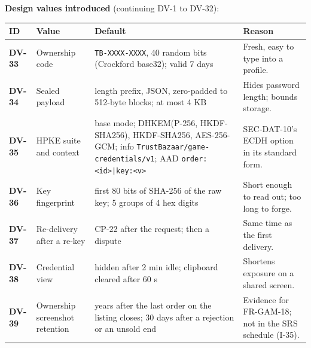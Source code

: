 \documentclass[11pt,a4paper]{article}
\newenvironment{dtable}[1]{\small\begin{longtable}{#1}}{\end{longtable}}
\begin{document}
\textbf{Design values introduced} (continuing DV-1 to DV-32):
\begin{dtable}{@{}>{\bfseries}p{1.3cm}>{\raggedright\arraybackslash}p{4.4cm}>{\raggedright\arraybackslash}p{4.6cm}>{\raggedright\arraybackslash}p{4.6cm}@{}}
\toprule
\textnormal{\textbf{ID}} & \textbf{Value} & \textbf{Default} & \textbf{Reason} \\ \midrule \endhead
DV-33 & Ownership code & \texttt{TB-XXXX-XXXX}, 40 random bits (Crockford base32); valid 7 days & Fresh, easy to type into a profile. \\
DV-34 & Sealed payload & length prefix, JSON, zero-padded to 512-byte blocks; at most 4 KB & Hides password length; bounds storage. \\
DV-35 & HPKE suite and context & base mode; DHKEM(P-256, HKDF-SHA256), HKDF-SHA256, AES-256-GCM; info \texttt{TrustBazaar/\allowbreak game-credentials/\allowbreak v1}; AAD \texttt{order:<id>|\allowbreak key:<v>} & SEC-DAT-10's ECDH option in its standard form. \\
DV-36 & Key fingerprint & first 80 bits of SHA-256 of the raw key; 5 groups of 4 hex digits & Short enough to read out; too long to forge. \\
DV-37 & Re-delivery after a re-key & CP-22 after the request; then a dispute & Same time as the first delivery. \\
DV-38 & Credential view & hidden after 2 min idle; clipboard cleared after 60 s & Shortens exposure on a shared screen. \\
DV-39 & Ownership screenshot retention & 2 years after the last order on the listing closes; 30 days after a rejection or an unsold end & Evidence for FR-GAM-18; not in the SRS schedule (I-35). \\
\bottomrule
\end{dtable}
\end{document}
